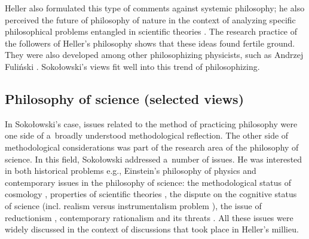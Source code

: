 \documentclass[%
  manuscript=article,
  year=2024,
  volume=77,
  doi=00000.000,
]{zfn}
\begin{document}
Heller also formulated this type of comments against systemic philosophy; he also perceived the future of philosophy of nature in the context of analyzing specific philosophical problems entangled in scientific theories 
\parencites[][]{Heller1986Jak}[][]{Heller1990Nowa}. %
 The research practice of the followers of Heller's philosophy shows that these ideas found fertile ground. They were also developed among other philosophizing physicists, such as Andrzej Fuliński 
\parencite[][]{Trombik2023Andrzej}. %
 Sokołowski's views fit well into this trend of philosophizing.



\subsection{ Philosophy of science (selected views)}



In Sokołowski's case, issues related to the method of practicing philosophy were one side of a~broadly understood methodological reflection. The other side of methodological considerations was part of the research area of the philosophy of science. In this field, Sokołowski addressed a~number of issues. He was interested in both historical problems e.g., Einstein's philosophy of physics
\parencites[see e.g.,][]{Sokoowski1987Alberta}[][]{Sokoowski1987Mysl1}[][]{Sokoowski1987Mysl2} %
 and contemporary issues in the philosophy of science: the methodological status of cosmology 
\parencites[][]{Sokoowski1978Czy}[][]{Sokoowski2015Granice}, %
 properties of scientific theories 
\parencites[][]{Sokoowski2006Teorie}[][]{Sokoowski2007Czowiek}, %
 the dispute on the cognitive status of science (incl. realism versus instrumentalism problem
\parencite[][]{Sokoowski1986Pluralizm}%
), the issue of reductionism 
\parencites[][]{Sokoowski1996W}[][]{Sokoowski1999Maa}[][]{Sokoowski2006Teorie}, %
 contemporary rationalism and its threats 
\parencites[][]{Sokoowski2001Wspoczesne}[][]{Sokoowski2006Alicja}. %
 All these issues were widely discussed in the context of discussions that took place in Heller's millieu.
\end{document}
